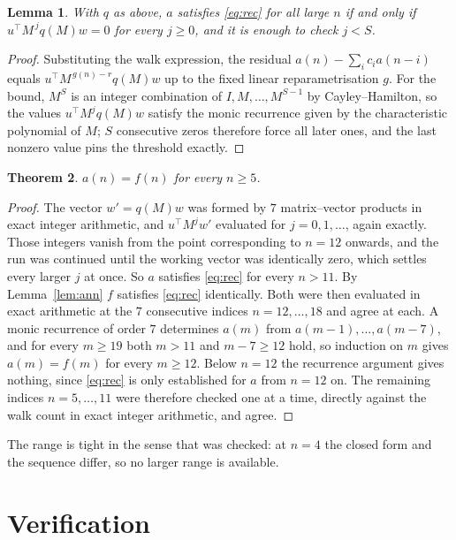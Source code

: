 \documentclass[11pt,a4paper]{article}
\theoremstyle{plain}
\newtheorem{theorem}{Theorem}
\newtheorem{lemma}[theorem]{Lemma}
\theoremstyle{definition}
\begin{document}
\begin{lemma}\label{lem:crit}
With $q$ as above, $a$ satisfies \eqref{eq:rec} for all large $n$ if and only if
$u^{\!\top}M^{\,j}q(M)w=0$ for every $j\ge0$, and it is enough to check $j<S$.
\end{lemma}

\begin{proof}
Substituting the walk expression, the residual $a(n)-\sum_ic_ia(n-i)$ equals
$u^{\!\top}M^{\,g(n)-r}q(M)w$ up to the fixed linear reparametrisation $g$. For the bound,
$M^{S}$ is an integer combination of $I,M,\dots,M^{S-1}$ by Cayley--Hamilton, so the values
$u^{\!\top}M^{j}q(M)w$ satisfy the monic recurrence given by the characteristic polynomial of
$M$; $S$ consecutive zeros therefore force all later ones, and the last nonzero value pins the
threshold exactly.
\end{proof}

\begin{theorem}
$a(n)=f(n)$ for every $n\ge5$.
\end{theorem}

\begin{proof}
The vector $w'=q(M)w$ was formed by $7$ matrix--vector products in exact integer
arithmetic, and $u^{\!\top}M^{j}w'$ evaluated for $j=0,1,\dots$, again exactly. Those integers
vanish from the point corresponding to $n=12$ onwards, and the run was continued until the
working vector was identically zero, which settles every larger $j$ at once. So $a$ satisfies
\eqref{eq:rec} for every $n>11$. By Lemma~\ref{lem:ann} $f$ satisfies \eqref{eq:rec}
identically. Both were then evaluated in exact arithmetic at the $7$ consecutive indices
$n=12,\dots,18$ and agree at each. A monic recurrence of order $7$
determines $a(m)$ from $a(m-1),\dots,a(m-7)$, and for every $m\ge19$ both
$m>11$ and $m-7\ge12$ hold, so induction on $m$ gives $a(m)=f(m)$ for every
$m\ge12$.
Below $n=12$ the recurrence argument gives nothing, since \eqref{eq:rec} is only
established for $a$ from $n=12$ on. The remaining indices $n=5,\dots,11$ were
therefore checked one at a time, directly against the walk count in exact integer arithmetic,
and agree.
\end{proof}

The range is tight in the sense that was checked: at $n=4$ the closed form and the sequence differ, so no larger range is available.

\section{Verification}
\end{document}
